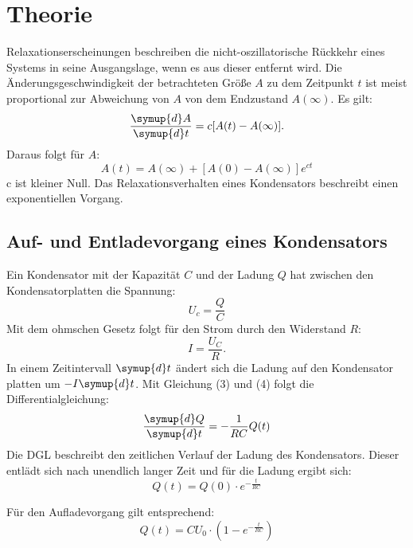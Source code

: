 \section{Theorie}
\label{sec:Theorie}


Relaxationserscheinungen beschreiben die nicht-oszillatorische Rückkehr eines Systems
in seine Ausgangslage, wenn es aus dieser entfernt wird. Die Änderungsgeschwindigkeit
der betrachteten Größe $A$ zu dem Zeitpunkt $t$ ist meist proportional zur Abweichung von $A$
von dem Endzustand $A(\infty)$. Es gilt:
\begin{equation}
  \frac{\symup{d}A}{\symup{d}t} = c[A(t)-A(\infty)].
\end{equation}
 Daraus folgt für $A$:
 \begin{equation}
   A(t) = A(\infty) + [A(0) - A(\infty)]e^{ct}
 \end{equation}
c ist kleiner Null. Das Relaxationsverhalten eines Kondensators beschreibt einen
exponentiellen Vorgang.

\subsection{Auf- und Entladevorgang eines Kondensators}

Ein Kondensator mit der Kapazität $C$ und der Ladung $Q$ hat zwischen den Kondensatorplatten
die Spannung:
\begin{equation}
  U_c = \frac{Q}{C}
\end{equation}
Mit dem ohmschen Gesetz folgt für den Strom durch den Widerstand $R$:
\begin{equation}
  I =\frac{U_C}{R}.
\end{equation}
In einem Zeitintervall $\symup{d}t$  ändert sich die Ladung auf den Kondensator platten um $-I\symup{d}t$.
Mit Gleichung (3) und (4) folgt die Differentialgleichung:
\begin{equation}
  \frac{\symup{d}Q}{\symup{d}t} = -\frac{1}{RC}Q(t)
\end{equation}
Die DGL beschreibt den zeitlichen Verlauf der Ladung des Kondensators. Dieser entlädt sich
nach unendlich langer Zeit und für die Ladung ergibt sich:
\begin{equation}
  Q(t) = Q(0) \cdot e^{-\frac{t}{RC}}   \label{eqn:Entladung}
\end{equation}

Für den Aufladevorgang gilt entsprechend:
\begin{equation}
  Q(t) = CU_0 \cdot (1 - e^{-\frac{t}{RC}})
\end{equation}

